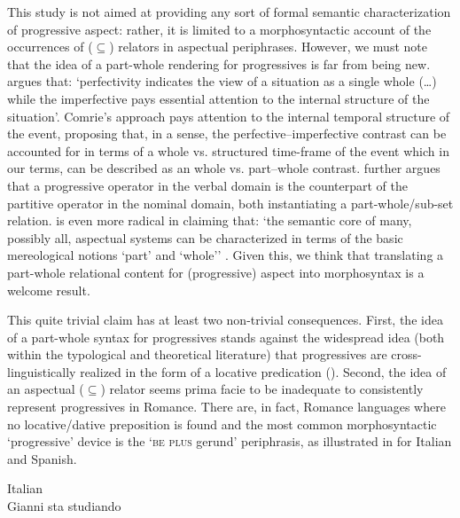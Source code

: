 \documentclass[output=paper,modfonts,nonflat,newtxmath,colorlinks,citecolor=brown]{langsci/langscibook}
\begin{document}
This study is not aimed at providing any sort of formal semantic characterization of progressive aspect: rather, it is limited to a morphosyntactic account of the occurrences of (${\subseteq}$) relators in aspectual periphrases. However, we must note that the idea of a part-whole rendering for progressives is far from being new. \citet[16]{Comrie1976} argues that: ‘perfectivity indicates the view of a situation as a single whole (…) while the imperfective pays essential attention to the internal structure of the situation’. Comrie’s approach pays attention to the internal temporal structure of the event, proposing that, in a sense, the perfective–imperfective contrast can be accounted for in terms of a  whole vs. structured time-frame of the event which in our terms, can be described as an whole {vs}. part–whole contrast. \citet{Bach1986} further argues that a progressive operator in the verbal domain is the counterpart of the partitive operator in the nominal domain, both instantiating a part-whole/sub-set relation. \citet{Filip1999} is even more radical in claiming that: ‘the semantic core of many, possibly all, aspectual systems can be characterized in terms of the basic mereological notions ‘part’ and ‘whole’’ \citep[158]{Filip1999}. Given this, we think that translating a part-whole relational content for (progressive) aspect into morphosyntax is a welcome result.  

This quite trivial claim has at least two non-trivial consequences. First, the idea of a part-whole syntax for progressives stands against the widespread idea (both within the typological and theoretical literature) that progressives are cross-linguistically realized in the form of a locative predication (\citealt{MateuAmadas1999, BybeeEtAl1994, DemirdacheUribe-Etxebarria1997}).  Second, the idea of an aspectual (${\subseteq}$) relator seems {prima facie} to be inadequate to consistently represent progressives in Romance. There are, in fact, Romance languages where no locative/dative preposition is found and the most common morphosyntactic ‘progressive’ device is the ‘\textsc{be plus} gerund’ periphrasis, as illustrated in  for Italian and Spanish. 

\ea%
    \label{ex:franco:9}
    \ea Italian\\\label{ex:franco:9a}
    \gll  Gianni sta studiando  \\
          \\
    \glt {}
    
\end{document}
